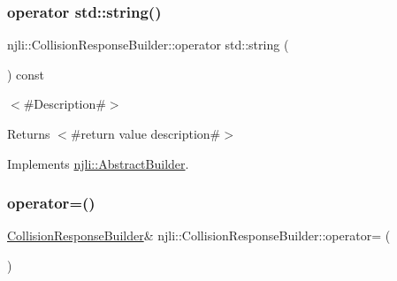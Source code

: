 \subsubsection{\texorpdfstring{operator std\+::string()}{operator std::string()}}
{\footnotesize\ttfamily njli\+::\+Collision\+Response\+Builder\+::operator std\+::string (\begin{DoxyParamCaption}{ }\end{DoxyParamCaption}) const\hspace{0.3cm}{\ttfamily [virtual]}}

$<$\#\+Description\#$>$

\begin{DoxyReturn}{Returns}
$<$\#return value description\#$>$ 
\end{DoxyReturn}


Implements \mbox{\hyperlink{classnjli_1_1_abstract_builder_a3e6e553e06d1ca30517ad5fb0bd4d000}{njli\+::\+Abstract\+Builder}}.

\mbox{\label{classnjli_1_1_collision_response_builder_a8560ccb4c41c8ac2fa96000f458634a2}} 
\subsubsection{\texorpdfstring{operator=()}{operator=()}}
{\footnotesize\ttfamily \mbox{\hyperlink{classnjli_1_1_collision_response_builder}{Collision\+Response\+Builder}}\& njli\+::\+Collision\+Response\+Builder\+::operator= (\begin{DoxyParamCaption}\item[{const \mbox{\hyperlink{classnjli_1_1_collision_response_builder}{Collision\+Response\+Builder}} \&}]{ }\end{DoxyParamCaption})\hspace{0.3cm}{\ttfamily [protected]}}

\mbox{\label{classnjli_1_1_collision_response_builder_af3731e9877af4f074ea1aa555d20007d}} 
